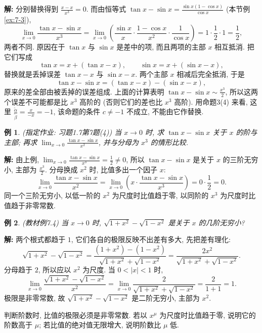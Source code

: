 \documentclass[UTF8,openany]{ctexbook}
\theoremstyle{chinesetextbook}
\newtheorem{example}{例}[section]
\newenvironment{cnsolution}{\par\indent\textbf{解:} \ignorespaces}{\par}
\begin{document}
\begin{cnsolution}
分别替换得到 $\displaystyle\frac{x-x}{x^3}=0$. 而由恒等式 $\displaystyle\tan x-\sin x=\frac{\sin x(1-\cos x)}{\cos x}$ (本节例\ref{ex:7-3}),
\[
\lim_{x\to0}\frac{\tan x-\sin x}{x^3}=\lim_{x\to0}\left(\frac{\sin x}x\cdot\frac{1-\cos x}{x^2}\cdot\frac1{\cos x}\right)=1\cdot\frac12\cdot1=\frac12,
\]
两者不同. 原因在于 $\tan x$ 与 $\sin x$ 是差中的项, 而且两项的主部 $x$ 相互抵消. 把它们写成
\[
\tan x=x+(\tan x-x),\qquad\sin x=x+(\sin x-x),
\]
替换就是丢掉误差 $\tan x-x$ 与 $\sin x-x$. 两个主部 $x$ 相减后完全抵消, 于是
\[
\tan x-\sin x=(\tan x-x)-(\sin x-x),
\]
原来的差全部由被丢掉的误差组成. 上面的计算表明 $\displaystyle\tan x-\sin x\sim\frac{x^3}2$, 所以这两个误差不可能都是比 $x^3$ 高阶的 (否则它们的差也比 $x^3$ 高阶). 用命题3(4) 来看, 这里 $\displaystyle\frac{\widetilde\alpha}{\widetilde\beta}=\frac x{-x}=-1$, 该命题的条件 $c\ne-1$ 不成立, 不能由它作替换.
\end{cnsolution}
\begin{example}
\textnormal{(指定作业: 习题1.7第7题(4))} 当 $x\to0$ 时, 求 $\tan x-\sin x$ 关于 $x$ 的阶与主部; 再求 $\displaystyle\lim_{x\to0}\frac{\tan x-\sin x}{x^2}$, 并与分母为 $x^3$ 的情形比较.
\end{example}
\begin{cnsolution}
由上例, $\displaystyle\lim_{x\to0}\frac{\tan x-\sin x}{x^3}=\frac12\ne0$, 所以 $\tan x-\sin x$ 是关于 $x$ 的三阶无穷小, 主部为 $\displaystyle\frac{x^3}2$. 分母换成 $x^2$ 时, 比值多出一个因子 $x$:
\[
\lim_{x\to0}\frac{\tan x-\sin x}{x^2}=\lim_{x\to0}\left(x\cdot\frac{\tan x-\sin x}{x^3}\right)=0\cdot\frac12=0.
\]
同一个三阶无穷小, 以低一阶的 $x^2$ 为尺度时比值趋于零, 以同阶的 $x^3$ 为尺度时比值趋于非零常数.
\end{cnsolution}
\begin{example}
\textnormal{(教材例7.4)} 当 $x\to0$ 时, $\sqrt{1+x^2}-\sqrt{1-x^2}$ 是关于 $x$ 的几阶无穷小?
\end{example}
\begin{cnsolution}
两个根式都趋于 $1$, 它们各自的极限反映不出差有多大, 先把差有理化:
\[
\sqrt{1+x^2}-\sqrt{1-x^2}=\frac{(1+x^2)-(1-x^2)}{\sqrt{1+x^2}+\sqrt{1-x^2}}=\frac{2x^2}{\sqrt{1+x^2}+\sqrt{1-x^2}}.
\]
分母趋于 $2$, 所以应以 $x^2$ 为尺度. 当 $0<|x|<1$ 时,
\[
\lim_{x\to0}\frac{\sqrt{1+x^2}-\sqrt{1-x^2}}{x^2}=\lim_{x\to0}\frac2{\sqrt{1+x^2}+\sqrt{1-x^2}}=\frac2{1+1}=1.
\]
极限是非零常数, 故 $\sqrt{1+x^2}-\sqrt{1-x^2}$ 是二阶无穷小, 主部为 $x^2$.
\end{cnsolution}
判断阶数时, 比值的极限必须是非零常数. 若以 $x^\mu$ 为尺度时比值趋于零, 说明它的阶数高于 $\mu$; 若比值的绝对值无限增大, 说明阶数比 $\mu$ 低.
\end{document}
